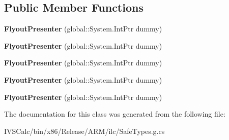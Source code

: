 \subsection*{Public Member Functions}
\begin{DoxyCompactItemize}
\item 
\mbox{\label{class_windows_1_1_u_i_1_1_xaml_1_1_controls_1_1_flyout_presenter_a55c989ea4269f65b1b75271e0cd6794a}} 
{\bfseries Flyout\+Presenter} (global\+::\+System.\+Int\+Ptr dummy)
\item 
\mbox{\label{class_windows_1_1_u_i_1_1_xaml_1_1_controls_1_1_flyout_presenter_a55c989ea4269f65b1b75271e0cd6794a}} 
{\bfseries Flyout\+Presenter} (global\+::\+System.\+Int\+Ptr dummy)
\item 
\mbox{\label{class_windows_1_1_u_i_1_1_xaml_1_1_controls_1_1_flyout_presenter_a55c989ea4269f65b1b75271e0cd6794a}} 
{\bfseries Flyout\+Presenter} (global\+::\+System.\+Int\+Ptr dummy)
\item 
\mbox{\label{class_windows_1_1_u_i_1_1_xaml_1_1_controls_1_1_flyout_presenter_a55c989ea4269f65b1b75271e0cd6794a}} 
{\bfseries Flyout\+Presenter} (global\+::\+System.\+Int\+Ptr dummy)
\item 
\mbox{\label{class_windows_1_1_u_i_1_1_xaml_1_1_controls_1_1_flyout_presenter_a55c989ea4269f65b1b75271e0cd6794a}} 
{\bfseries Flyout\+Presenter} (global\+::\+System.\+Int\+Ptr dummy)
\end{DoxyCompactItemize}


The documentation for this class was generated from the following file\+:\begin{DoxyCompactItemize}
\item 
I\+V\+S\+Calc/bin/x86/\+Release/\+A\+R\+M/ilc/Safe\+Types.\+g.\+cs\end{DoxyCompactItemize}
